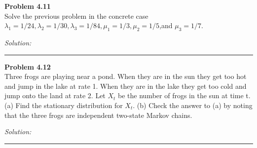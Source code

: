 \documentclass[a4paper, 11pt]{article}
\newenvironment{problem}[2][Problem]
    { \begin{mdframed}[backgroundcolor=gray!20] \textbf{#1 #2} \\}
    {  \end{mdframed}}
\newenvironment{solution}
    {\textit{Solution:}}
    {}
\begin{document}
\begin{problem}{4.11}
Solve the previous problem in the concrete case $\lambda_1 = 1/24, \lambda_2 = 1/30, \lambda_3 =1/84,\mu_1 =1/3,\mu_2 =1/5$,and $ \mu_3 =1/7.$
\end{problem}
\begin{solution}


\end{solution} 
%
\noindent\rule{7in}{2.8pt}

\begin{problem}{4.12}
Three frogs are playing near a pond. When they are in the sun they get too hot and jump in the lake at rate 1. When they are in the lake they get too cold and jump onto the land at rate 2. Let $X_t$ be the number of frogs in the sun at time t. (a) Find the stationary distribution for $X_t$. (b) Check the answer to (a) by noting that the three frogs are independent two-state Markov chains.
\end{problem}
\begin{solution}


\end{solution} 
%
\noindent\rule{7in}{2.8pt}
\end{document}
